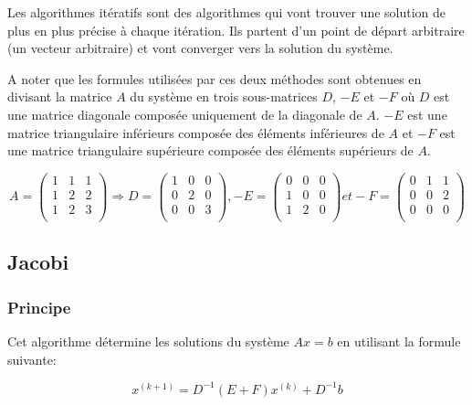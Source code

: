\documentclass[a4paper]{article}
\begin{document}
Les algorithmes itératifs sont des algorithmes qui vont trouver une solution de
plus en plus précise à chaque itération. Ils partent d'un point de départ
arbitraire (un vecteur arbitraire) et vont converger vers la solution du
système.

A noter que les formules utilisées par ces deux méthodes sont obtenues en
divisant la matrice $A$ du système en trois sous-matrices $D$, $-E$ et $-F$ où
$D$ est une matrice diagonale composée uniquement de la diagonale de $A$. $-E$
est une matrice triangulaire inférieurs composée des éléments inférieures de $A$
et $-F$ est une matrice triangulaire supérieure composée des éléments supérieurs
de $A$.


\[
A = 
\begin{pmatrix}
  1 & 1 & 1\\
  1 & 2 & 2\\
  1 & 2 & 3\\
\end{pmatrix} \Rightarrow
D =
\begin{pmatrix}
  1 & 0 & 0\\
  0 & 2 & 0\\
  0 & 0 & 3\\
\end{pmatrix},
-E =
\begin{pmatrix}
  0 & 0 & 0\\
  1 & 0 & 0\\
  1 & 2 & 0\\
\end{pmatrix} et
-F =
\begin{pmatrix}
  0 & 1 & 1\\
  0 & 0 & 2\\
  0 & 0 & 0\\
\end{pmatrix}
\]

\clearpage

\subsection{Jacobi}

\subsubsection{Principe}

Cet algorithme détermine les solutions du système $Ax = b$ en utilisant la
formule suivante:

\[x^{(k+1)} = D^{-1}(E+F)x^{(k)} + D^{-1}b\]
\end{document}
